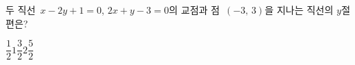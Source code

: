두 직선~$x-2y+1=0$, $2x+y-3=0$의 교점과 점~$(-3,\,3)$을 지나는 직선의 $y$절편은?
\begin{choices32}{$\dfrac{1}{2}$}{$1$}{$\dfrac{3}{2}$}{$2$}{$\dfrac{5}{2}$}\end{choices32}
